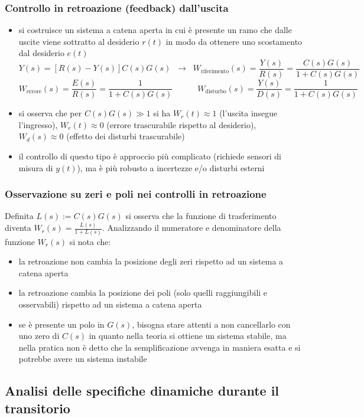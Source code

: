 \subsubsection*{Controllo in retroazione (feedback) dall'uscita}
\begin{itemize}
	\item si costruisce un sistema a catena aperta in cui è presente un ramo che dalle uscite viene sottratto al desiderio \(r(t)\)
	in modo da ottenere uno scostamento dal desiderio \(e(t)\)
	\[Y(s) = \left[R(s)-Y(s)\right] C(s) G(s) \;\; \rightarrow \;\; W_\text{riferimento}(s) = \frac{Y(s)}{R(s)} = \frac{C(s)G(s)}{1+C(s)G(s)}\]
	\[W_\text{errore}(s) = \frac{E(s)}{R(s)} = \frac{1}{1+C(s)G(s)} \qquad\quad W_\text{disturbo}(s) = \frac{Y(s)}{D(s)} = \frac{1}{1+C(s)G(s)}\]
	\item si osserva che per \(C(s)G(s) \gg 1\) si ha \(W_r(t) \approx 1\) (l'uscita insegue l'ingresso), \(W_e(t) \approx 0\)
	(errore trascurabile rispetto al desiderio), \(W_d(s) \approx 0\) (effetto dei disturbi trascurabile)
	\item il controllo di questo tipo è approccio più complicato (richiede sensori di misura di \(y(t)\)), ma è più robusto a
	incertezze e/o disturbi esterni
\end{itemize}

\subsubsection*{Osservazione su zeri e poli nei controlli in retroazione}
Definita \(L(s) := C(s)G(s)\) si osserva che la funzione di trasferimento diventa \(W_r(s) = \frac{L(s)}{1+L(s)}\). Analizzando il
numeratore e denominatore della funzione \(W_r(s)\) si nota che:
\begin{itemize}
	\item la retroazione non cambia la posizione degli zeri rispetto ad un sistema a catena aperta
	\item la retroazione cambia la posizione dei poli (solo quelli raggiungibili e osservabili) rispetto ad un sistema a catena aperta
	\item se è presente un polo  in \(G(s)\), bisogna stare attenti a non cancellarlo con uno zero di \(C(s)\) in quanto
	nella teoria si ottiene un sistema stabile, ma nella pratica non è detto che la semplificazione avvenga in maniera esatta e si potrebbe
	avere un sistema instabile
\end{itemize}

\subsection{Analisi delle specifiche dinamiche durante il transitorio}
